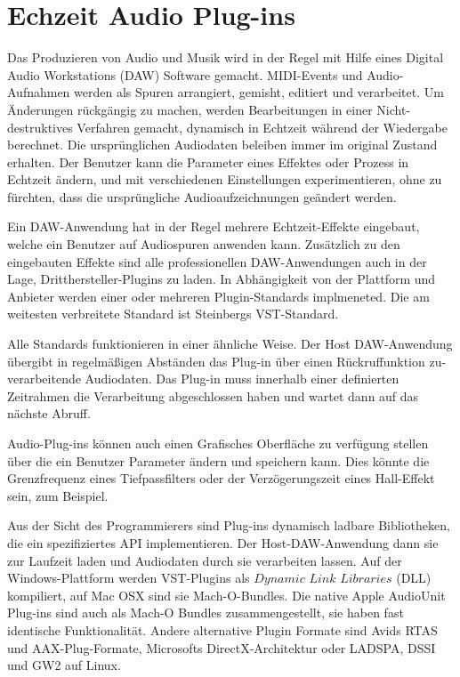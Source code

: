 \section{Echzeit Audio Plug-ins}

Das Produzieren von Audio und Musik wird in der Regel mit Hilfe eines Digital Audio Workstations (DAW) Software gemacht. MIDI-Events und Audio-Aufnahmen werden als Spuren arrangiert, gemisht, editiert und verarbeitet. Um Änderungen rückgängig zu machen, werden Bearbeitungen in einer Nicht-destruktives Verfahren gemacht, dynamisch in Echtzeit während der Wiedergabe berechnet. Die ursprünglichen Audiodaten beleiben immer im original Zustand erhalten. Der Benutzer kann die Parameter eines Effektes oder Prozess in Echtzeit ändern, und mit verschiedenen Einstellungen experimentieren, ohne zu fürchten, dass die ursprüngliche Audioaufzeichnungen geändert werden.

Ein DAW-Anwendung hat in der Regel mehrere Echtzeit-Effekte eingebaut, welche ein Benutzer auf Audiospuren anwenden kann. Zusätzlich zu den eingebauten Effekte sind alle professionellen DAW-Anwendungen auch in der Lage, Dritthersteller-Plugins zu laden. In Abhängigkeit von der Plattform und Anbieter werden einer oder mehreren Plugin-Standards implmeneted. Die am weitesten verbreitete Standard ist Steinbergs VST-Standard.

Alle Standards funktionieren in einer ähnliche Weise. Der Host DAW-Anwendung übergibt in regelmäßigen Abständen das Plug-in über einen Rückruffunktion zu-verarbeitende Audiodaten. Das Plug-in muss innerhalb einer definierten Zeitrahmen die Verarbeitung abgeschlossen haben und wartet dann auf das nächste Abruff.

Audio-Plug-ins können auch einen Grafisches Oberfläche zu verfügung stellen über die ein Benutzer Parameter ändern und speichern kann. Dies könnte die Grenzfrequenz eines Tiefpassfilters oder der Verzögerungszeit eines Hall-Effekt sein, zum Beispiel.

Aus der Sicht des Programmierers sind Plug-ins dynamisch ladbare Bibliotheken, die ein spezifiziertes API implementieren. Der Host-DAW-Anwendung dann sie zur Laufzeit laden und Audiodaten durch sie verarbeiten lassen\cite{realtime-architectures}. Auf der Windows-Plattform werden VST-Plugins als \(Dynamic\) \(Link\) \(Libraries\) (DLL) kompiliert, auf Mac OSX sind sie Mach-O-Bundles. Die native Apple AudioUnit Plug-ins sind auch als Mach-O Bundles zusammengestellt, sie haben fast identische Funktionalität. Andere alternative Plugin Formate sind Avids RTAS und AAX-Plug-Formate, Microsofts DirectX-Architektur oder LADSPA, DSSI und GW2 auf Linux.

